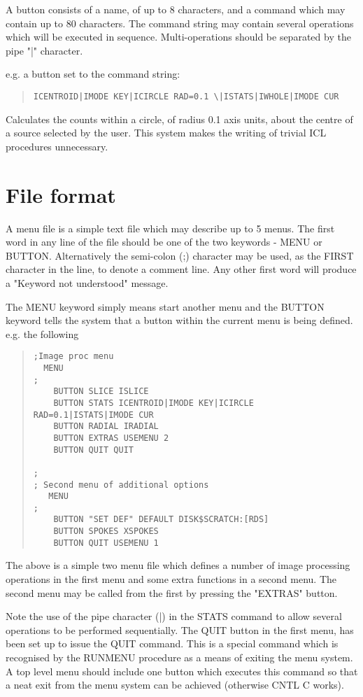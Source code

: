 \documentclass{book}
\renewcommand{\_}{{\tt\char'137}}     %
\begin{document}
A button consists of a name, of up to 8 characters, and a command which
may contain up to 80 characters. The command string may contain several
operations which will be executed in sequence. Multi-operations should be
separated by the pipe "|" character.

e.g. a button set to the command string:
\begin{quote}\begin{verbatim}
ICENTROID|IMODE KEY|ICIRCLE RAD=0.1 \|ISTATS|IWHOLE|IMODE CUR
\end{verbatim}\end{quote}
Calculates the counts within a circle, of radius 0.1 axis units, about the
centre of a source selected by the user. This system makes the writing of
trivial ICL procedures unnecessary.

\section{File format}
A menu file is a simple text file which may describe up to 5 menus.
The first word in any line of the file should be one of the two keywords -
MENU or BUTTON. Alternatively the semi-colon (;) character may be used,
as the FIRST character in the line, to denote a comment line. Any other
first word will produce a "Keyword not understood" message.

The MENU keyword simply means start another menu and the BUTTON keyword
tells the system that a button within the current menu is being defined.
e.g. the following

\begin{quote}\begin{verbatim}
;Image proc menu
  MENU
;
    BUTTON SLICE ISLICE
    BUTTON STATS ICENTROID|IMODE KEY|ICIRCLE RAD=0.1|ISTATS|IMODE CUR
    BUTTON RADIAL IRADIAL
    BUTTON EXTRAS USEMENU 2
    BUTTON QUIT QUIT

;
; Second menu of additional options
   MENU
;
    BUTTON "SET DEF" DEFAULT DISK$SCRATCH:[RDS]
    BUTTON SPOKES XSPOKES
    BUTTON QUIT USEMENU 1
\end{verbatim}\end{quote}
The above is a simple two menu file which defines a number of image
processing operations in the first menu and some extra functions in a
second menu. The second menu may be called from the first by pressing
the "EXTRAS" button.

Note the use of the pipe character (|) in the STATS command to
allow several operations to be performed sequentially. The QUIT
button in the first menu, has been set up to issue the QUIT command.
This is a special command which is recognised by the RUNMENU procedure as
a means of exiting the menu system. A top level menu should include one
button which executes this command so that a neat exit from the menu
system can be achieved (otherwise CNTL C works).
\end{document}
